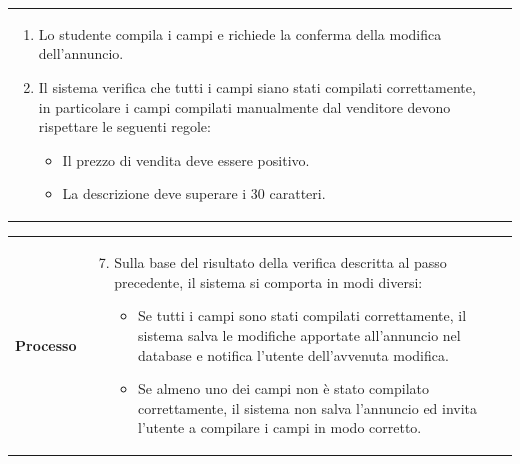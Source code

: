 \documentclass[10pt,a4paper]{report}
\begin{document}
\begin{tabular}{lp{}}
\begin{enumerate}
\begin{itemize}
				\item Almeno una foto.
			\end{itemize}
			\item Lo studente compila i campi e richiede la conferma della modifica dell'annuncio.
			\item Il sistema verifica che tutti i campi siano stati compilati correttamente, in particolare i campi compilati manualmente dal venditore devono rispettare le seguenti regole:
			\begin{itemize}
				\item Il prezzo di vendita deve essere positivo.
				\item La descrizione deve superare i 30 caratteri.
			\end{itemize}
		\end{enumerate}
	\end{tabular}
	
	\begin{tabular}{lp{}}
		\textbf{Processo}&\begin{enumerate}
			\setcounter{enumi}{6}
			\item Sulla base del risultato della verifica descritta al passo precedente, il sistema si comporta in modi diversi:
			\begin{itemize}
				\item Se tutti i campi sono stati compilati correttamente, il sistema salva le modifiche apportate all'annuncio nel database e notifica l'utente dell'avvenuta modifica.
				\item Se almeno uno dei campi non è stato compilato correttamente, il sistema non salva l'annuncio ed invita l'utente a compilare i campi in modo corretto.
			\end{itemize}
		\end{enumerate}
	\end{tabular}
	
\end{document}
